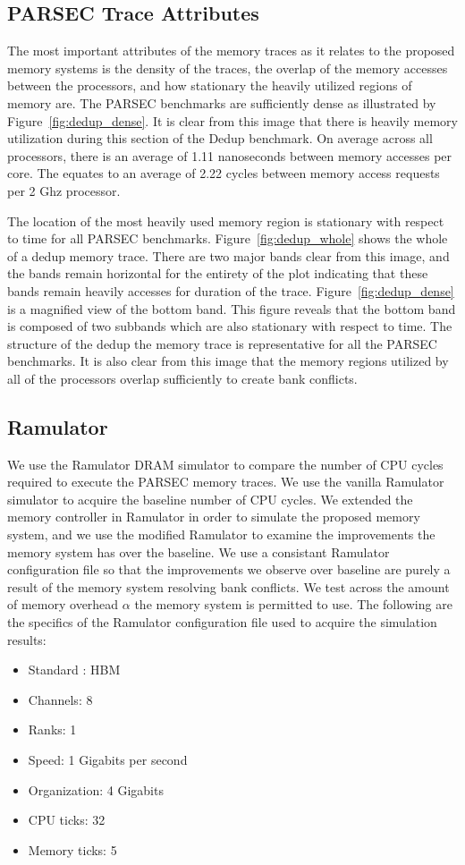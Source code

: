 \subsection{PARSEC Trace Attributes}

The most important attributes of the memory traces as it relates to the proposed memory systems is the density of the traces, the overlap of the memory accesses between the processors, and how stationary the heavily utilized regions of memory are. The PARSEC benchmarks are sufficiently dense as illustrated by Figure~\ref{fig:dedup_dense}. It is clear from this image that there is heavily memory utilization during this section of the Dedup benchmark. On average across all processors, there is an average of 1.11 nanoseconds between memory accesses per core. The equates to an average of 2.22 cycles between memory access requests per 2 Ghz processor. 


The location of the most heavily used memory region is stationary with respect to time for all PARSEC benchmarks. Figure~\ref{fig:dedup_whole} shows the whole of a dedup memory trace. There are two major bands clear from this image, and the bands remain horizontal for the entirety of the plot indicating that these bands remain heavily accesses for duration of the trace. Figure~\ref{fig:dedup_dense} is a magnified view of the bottom band. This figure reveals that the bottom band is composed of two subbands which are also stationary with respect to time. The structure of the dedup the memory trace is representative for all the PARSEC benchmarks. It is also clear from this image that the memory regions utilized by all of the processors overlap sufficiently to create bank conflicts.

\subsection{Ramulator}

We use the Ramulator DRAM simulator to compare the number of CPU cycles required to execute the PARSEC memory traces. We use the vanilla Ramulator simulator to acquire the baseline number of CPU cycles. We extended the memory controller in Ramulator in order to simulate the proposed memory system, and we use the modified Ramulator to examine the improvements the memory system has over the baseline. We use a consistant Ramulator configuration file so that the improvements we observe over baseline are purely a result of the memory system resolving bank conflicts. We test across the amount of memory overhead $\alpha$ the memory system is permitted to use. 
The following are the specifics of the Ramulator configuration file used to acquire the simulation results:
\begin{itemize}
\item Standard : HBM
\item Channels: 8
\item Ranks: 1
\item Speed: 1 Gigabits per second
\item Organization: 4 Gigabits
\item CPU ticks: 32
\item Memory ticks: 5
\end{itemize}
